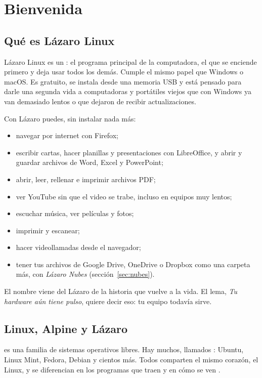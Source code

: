 \chapter{Bienvenida}\label{cap:01-bienvenida}

\section{Qué es Lázaro Linux}

Lázaro Linux es un : el programa principal de la
computadora, el que se enciende primero y deja usar todos los demás. Cumple
el mismo papel que Windows o macOS. Es gratuito, se instala desde una
memoria USB y está pensado para darle una segunda vida a computadoras y
portátiles viejos que con Windows ya van demasiado lentos o que dejaron de
recibir actualizaciones.

Con Lázaro puedes, sin instalar nada más:
\begin{itemize}
  \item navegar por internet con Firefox;
  \item escribir cartas, hacer planillas y presentaciones con LibreOffice, y
        abrir y guardar archivos de Word, Excel y PowerPoint;
  \item abrir, leer, rellenar e imprimir archivos PDF;
  \item ver YouTube sin que el video se trabe, incluso en equipos muy lentos;
  \item escuchar música, ver películas y fotos;
  \item imprimir y escanear;
  \item hacer videollamadas desde el navegador;
  \item tener tus archivos de Google Drive, OneDrive o Dropbox como una
        carpeta más, con \emph{Lázaro Nubes} (sección~\ref{sec:nubes}).
\end{itemize}

El nombre viene del Lázaro de la historia que vuelve a la vida. El lema,
\emph{Tu hardware aún tiene pulso}, quiere decir eso: tu equipo todavía
sirve.

\section{Linux, Alpine y Lázaro}

 es una familia de sistemas operativos libres. Hay muchos,
llamados : Ubuntu, Linux Mint, Fedora, Debian y
cientos más. Todos comparten el mismo corazón, el  Linux,
y se diferencian en los programas que traen y en cómo se ven
\cite{gnu-linux}.

